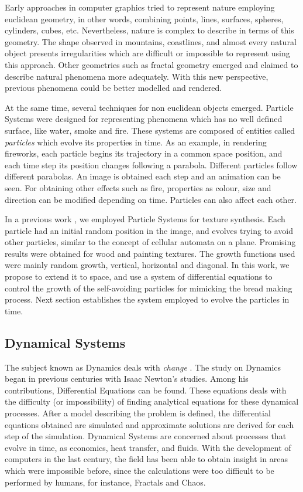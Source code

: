 \documentclass[oneside,a4paper,english,links]{amca}
\begin{document}
Early approaches in computer graphics tried to represent nature employing euclidean geometry, in other words, combining points, lines, surfaces, spheres, cylinders, cubes, etc. Nevertheless, nature is complex to describe in terms of this geometry. The shape observed in mountains, coastlines,  and almost every natural object presents irregularities which are difficult or impossible to represent using this approach. Other geometries such as fractal geometry \citep{Mandelbrot83} emerged and claimed to describe natural phenomena more adequately. With this new perspective, previous phenomena could be better modelled and rendered. 

At the same time, several techniques for non euclidean objects emerged. Particle Systems \citep{Reeves83} were designed for representing phenomena which has no well defined surface, like water, smoke and fire. These systems are composed of entities called {\em particles} which evolve its properties in time. As an example, in rendering fireworks, each particle begins its trajectory in a common space position, and each time step its position changes following a parabola. Different particles follow different parabolas. An image is obtained each step and an animation can be seen. For obtaining other effects such as fire, properties as colour, size and direction can be modified depending on time. Particles can also affect each other.

In a previous work \citep{Baravalle2011}, we employed Particle Systems for texture synthesis. Each particle had an initial random position in the image, and evolves trying to avoid other particles, similar to the concept of cellular automata on a plane. Promising results were obtained for wood and painting textures. The growth functions used were mainly random growth, vertical, horizontal and diagonal. In this work, we propose to extend it to space, and use a system of differential equations to control the growth of the self-avoiding particles for mimicking the bread making process. Next section establishes the system employed to evolve the particles in time.

\subsection{Dynamical Systems}

The subject known as Dynamics deals with {\em change} \citep{Strogatz2001}. The study on Dynamics began in previous centuries with Isaac Newton's studies. Among his contributions, Differential Equations can be found. These equations deals with the difficulty (or impossibility) of finding analytical equations for these dynamical processes. After a model describing the problem is defined, the differential equations obtained are simulated and approximate solutions are derived for each step of the simulation. Dynamical Systems are concerned about processes that evolve in time, as economics, heat transfer, and fluids. With the development of computers in the last century, the field has been able to obtain insight in areas which were impossible before, since the calculations were too difficult to be performed by humans, for instance, Fractals \citep{Mandelbrot83} and Chaos.
\end{document}
